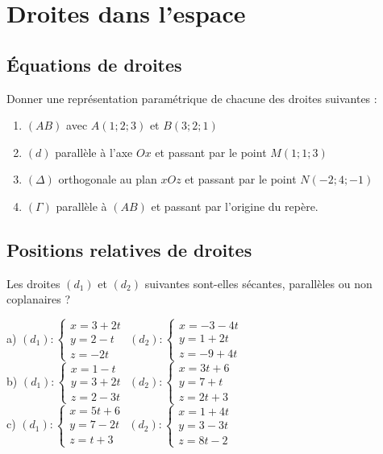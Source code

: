 \documentclass[oneside,12pt]{article}          %
\begin{document}
\section{Droites dans l'espace}

\subsection{Équations de droites}
Donner une représentation paramétrique de chacune des droites suivantes :
\begin{enumerate}
    \item $(AB)$ avec $A(1;2;3)$ et $B(3;2;1)$
    \item $(d)$ parallèle à l'axe $Ox$ et passant par le point $M(1;1;3)$
    \item $(\Delta)$ orthogonale au plan $xOz$ et passant par le point $N(-2;4;-1)$
    \item $(\Gamma)$ parallèle à $(AB)$ et passant par l'origine du repère.
\end{enumerate}



\subsection{Positions relatives de droites}
Les droites $(d_1)$ et $(d_2)$ suivantes sont-elles sécantes, parallèles ou non coplanaires ?

a) $(d_1):\begin{cases}x=3+2t\\y=2-t\\z=-2t\end{cases}$ \qquad
$(d_2):\begin{cases}x=-3-4t\\y=1+2t\\z=-9+4t\end{cases}$ \\[15pt]
b) $(d_1):\begin{cases}x=1-t\\y=3+2t\\z=2-3t\end{cases}$ \qquad
$(d_2):\begin{cases}x=3t+6\\y=7+t\\z=2t+3\end{cases}$ \\[15pt]
c) $(d_1):\begin{cases}x=5t+6\\y=7-2t\\z=t+3\end{cases}$ \qquad 
$(d_2):\begin{cases}x=1+4t\\y=3-3t\\z=8t-2\end{cases}$ 
\end{document}
